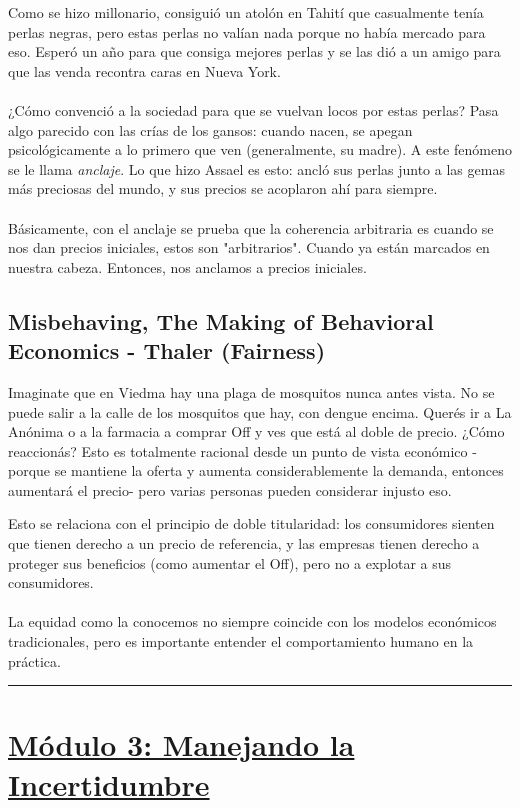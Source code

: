 \documentclass{article}
\newcommand*\sepline{%
  \begin{center}
    \rule[1ex]{.5\textwidth}{.5pt}
  \end{center}}
\begin{document}
            Como se hizo millonario, consiguió un atolón en Tahití que casualmente tenía perlas negras, pero estas perlas no valían nada porque no había mercado para eso. Esperó un año para que consiga mejores perlas y se las dió a un amigo para que las venda recontra caras en Nueva York.
            \\
            \\
            ¿Cómo convenció a la sociedad para que se vuelvan locos por estas perlas? Pasa algo parecido con las crías de los gansos: cuando nacen, se apegan psicológicamente a lo primero que ven (generalmente, su madre). A este fenómeno se le llama \emph{anclaje}. Lo que hizo Assael es esto: ancló sus perlas junto a las gemas más preciosas del mundo, y sus precios se acoplaron ahí para siempre.
            \\
            \\
            Básicamente, con el anclaje se prueba que la coherencia arbitraria es cuando se nos dan precios iniciales, estos son "arbitrarios". Cuando ya están marcados en nuestra cabeza. Entonces, nos anclamos a precios iniciales.

        \subsection*{Misbehaving, The Making of Behavioral Economics - Thaler (Fairness)}
            Imaginate que en Viedma hay una plaga de mosquitos nunca antes vista. No se puede salir a la calle de los mosquitos que hay, con dengue encima. Querés ir a La Anónima o a la farmacia a comprar Off y ves que está al doble de precio. ¿Cómo reaccionás? Esto es totalmente racional desde un punto de vista económico -porque se mantiene la oferta y aumenta considerablemente la demanda, entonces aumentará el precio- pero varias personas pueden considerar injusto eso.

            Esto se relaciona con el principio de doble titularidad: los consumidores sienten que tienen derecho a un precio de referencia, y las empresas tienen derecho a proteger sus beneficios (como aumentar el Off), pero no a explotar a sus consumidores.
            \\
            \\
            La equidad como la conocemos no siempre coincide con los modelos económicos tradicionales, pero es importante entender el comportamiento humano en la práctica.
            
    \sepline

    \section*{\underline{Módulo 3: Manejando la Incertidumbre}}
\end{document}
